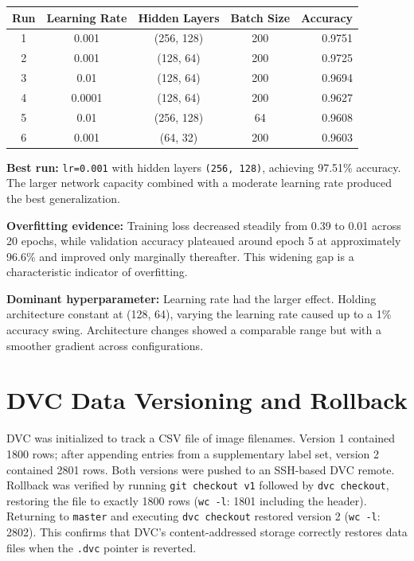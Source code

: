 \documentclass[10pt, a4paper]{article}
\begin{document}
\vspace{2pt}
\begin{center}
\small
\begin{tabular}{ccccr}
\toprule
\textbf{Run} & \textbf{Learning Rate} & \textbf{Hidden Layers} & \textbf{Batch Size} & \textbf{Accuracy} \\
\midrule
1 & 0.001  & (256, 128) & 200 & 0.9751 \\
2 & 0.001  & (128, 64)  & 200 & 0.9725 \\
3 & 0.01   & (128, 64)  & 200 & 0.9694 \\
4 & 0.0001 & (128, 64)  & 200 & 0.9627 \\
5 & 0.01   & (256, 128) & 64  & 0.9608 \\
6 & 0.001  & (64, 32)   & 200 & 0.9603 \\
\bottomrule
\end{tabular}
\end{center}
\vspace{2pt}

\textbf{Best run:} \texttt{lr=0.001} with hidden layers \texttt{(256, 128)}, achieving 97.51\% accuracy. The larger network capacity combined with a moderate learning rate produced the best generalization.

\textbf{Overfitting evidence:} Training loss decreased steadily from 0.39 to 0.01 across 20 epochs, while validation accuracy plateaued around epoch 5 at approximately 96.6\% and improved only marginally thereafter. This widening gap is a characteristic indicator of overfitting.

\textbf{Dominant hyperparameter:} Learning rate had the larger effect. Holding architecture constant at (128, 64), varying the learning rate caused up to a 1\% accuracy swing. Architecture changes showed a comparable range but with a smoother gradient across configurations.

\section{DVC Data Versioning and Rollback}

DVC was initialized to track a CSV file of image filenames. Version 1 contained 1800 rows; after appending entries from a supplementary label set, version 2 contained 2801 rows. Both versions were pushed to an SSH-based DVC remote. Rollback was verified by running \texttt{git checkout v1} followed by \texttt{dvc checkout}, restoring the file to exactly 1800 rows (\texttt{wc -l}: 1801 including the header). Returning to \texttt{master} and executing \texttt{dvc checkout} restored version 2 (\texttt{wc -l}: 2802). This confirms that DVC's content-addressed storage correctly restores data files when the \texttt{.dvc} pointer is reverted.
\end{document}
